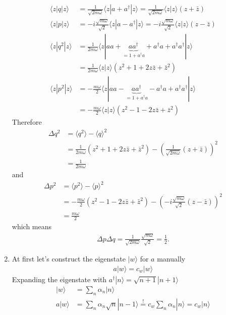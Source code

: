 \documentclass[10pt,a4paper]{book}
\theoremstyle{definition}
\begin{document}
\begin{enumerate}
\begin{align}
    \langle z|q|z\rangle
    &=\frac{1}{\sqrt{2m\omega}}\langle z|a+a^\dagger|z\rangle
    =\frac{1}{\sqrt{2m\omega}}\langle z|z\rangle(z+\bar{z})\\
    \langle z|p|z\rangle&=-i\frac{\sqrt{m\omega}}{\sqrt{2}}\langle z|a-a^\dagger|z\rangle=
    -i\frac{\sqrt{m\omega}}{\sqrt{2}}\langle z|z\rangle(z-\bar{z})\\
    \langle z|q^2|z\rangle
    &=\frac{1}{2m\omega}\langle z|aa+\underbrace{aa^\dagger}_{=1+a^\dagger a}+a^\dagger a+a^\dagger a^\dagger|z\rangle\\
    &=\frac{1}{2m\omega}\langle z|z\rangle\left(z^2+1+2z\bar{z}+\bar{z}^2\right)\\
    \langle z|p^2|z\rangle
    &=-\frac{m\omega}{2}\langle z|aa-\underbrace{aa^\dagger}_{=1+a^\dagger a}-a^\dagger a+a^\dagger a^\dagger|z\rangle\\
    &=-\frac{m\omega}{2}\langle z|z\rangle\left(z^2-1-2z\bar{z}+\bar{z}^2\right)
\end{align}
Therefore
\begin{align}
    \Delta q^2
    &=\langle q^2\rangle-\langle q\rangle^2\\
    &=\frac{1}{2m\omega}\left(z^2+1+2z\bar{z}+\bar{z}^2\right)-\left(\frac{1}{\sqrt{2m\omega}}(z+\bar{z})\right)^2\\
    &=\frac{1}{2m\omega}
\end{align}
and
\begin{align}
    \Delta p^2
    &=\langle p^2\rangle-\langle p\rangle^2\\
    &=-\frac{m\omega}{2}\left(z^2-1-2z\bar{z}+\bar{z}^2\right)-\left(-i\frac{\sqrt{m\omega}}{\sqrt{2}}(z-\bar{z})\right)^2\\
    &=\frac{m\omega}{2}
\end{align}
which means
\begin{align}
    \Delta p\Delta q=\frac{1}{\sqrt{2m\omega}}\frac{\sqrt{m\omega}}{\sqrt{2}}=\frac{1}{2}.
\end{align}
\item At first let's construct the eigenstate $|w\rangle$ for $a$ manually
\begin{align}
    a|w\rangle=c_w|w\rangle
\end{align}
Expanding the eigenstate with $a^\dagger|n\rangle=\sqrt{n+1}|n+1\rangle$
\begin{align}
    |w\rangle
    &=\sum_n\alpha_n|n\rangle\\
    a|w\rangle
    &=\sum_n\alpha_n\sqrt{n}|n-1\rangle\overset{!}{=}c_w\sum_n\alpha_n|n\rangle=c_w|n\rangle\\

\end{align}
\end{enumerate}
\end{document}
